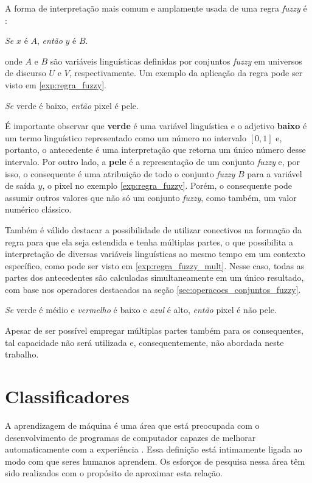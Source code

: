 A forma de interpretação mais comum e amplamente usada de uma regra \emph{fuzzy} é \citep{dubois:96}:
\begin{center}
\emph{Se} $x$ é $A$, \emph{então} $y$ é $B$.
\end{center}
\noindent onde $A$ e $B$ são variáveis linguísticas definidas por conjuntos \emph{fuzzy} em universos de discurso $U$ e $V$, respectivamente. Um exemplo da aplicação da regra pode ser visto em \ref{exp:regra_fuzzy}.

\begin{exmp}
\label{exp:regra_fuzzy}
\emph{Se} verde é baixo, \emph{então} pixel é pele.
\end{exmp}

É importante observar que \textbf{verde} é uma variável linguística e o adjetivo \textbf{baixo} é um termo linguístico representado como um número no intervalo $[0, 1]$ e, portanto, o antecedente é uma interpretação que retorna um único número desse intervalo. Por outro lado, a \textbf{pele} é a representação de um conjunto \emph{fuzzy} e, por isso, o consequente é uma atribuição de todo o conjunto \emph{fuzzy} $B$ para a variável de saída $y$, o pixel no exemplo \ref{exp:regra_fuzzy}. Porém, o consequente pode assumir outros valores que não só um conjunto \emph{fuzzy}, como também, um valor numérico clássico.

Também é válido destacar a possibilidade de utilizar conectivos na formação da regra para que ela seja estendida e tenha múltiplas partes, o que possibilita a interpretação de diversas variáveis linguísticas ao mesmo tempo em um contexto específico, como pode ser visto em \ref{exp:regra_fuzzy_mult}. Nesse caso, todas as partes dos antecedentes são calculadas simultaneamente em um único resultado, com base nos operadores destacados na seção \ref{sec:operacoes_conjuntos_fuzzy}.

\begin{exmp}
\label{exp:regra_fuzzy_mult}
\emph{Se} verde é médio e \emph{vermelho} é baixo e \emph{azul} é alto, \emph{então} pixel é não pele.
\end{exmp}

Apesar de ser possível empregar múltiplas partes também para os consequentes, tal capacidade não será utilizada e, consequentemente, não abordada neste trabalho.


\section{Classificadores}
\label{sec:classificadores}
A aprendizagem de máquina é uma área que está preocupada com o desenvolvimento de programas de computador capazes de melhorar automaticamente com a experiência \citep{mitchell:97}. Essa definição está intimamente ligada ao modo com que seres humanos aprendem. Os esforços de pesquisa nessa área têm sido realizados com o propósito de aproximar esta relação.

